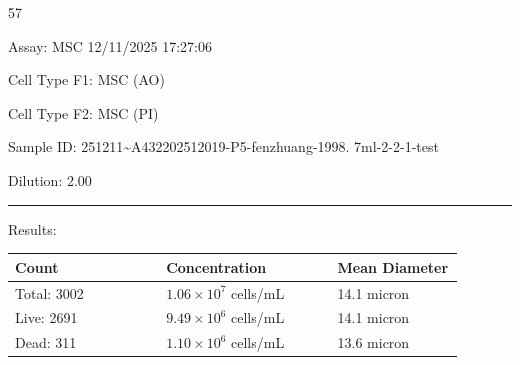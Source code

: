 \documentclass[UTF8,10pt,a4paper,fontset=fandol]{ctexart}
\newcommand{\fieldvalue}[1]{#1}
\newcommand{\handwritten}[1]{#1}
\begin{document}
\bigskip

\handwritten{57}

\newpage

\noindent
Assay:
\fieldvalue{MSC}
\hfill
\fieldvalue{12/11/2025 17:27:06}

\medskip

\noindent
Cell Type F1:
\fieldvalue{MSC (AO)}

\noindent
Cell Type F2:
\fieldvalue{MSC (PI)}

\medskip

\noindent
Sample ID:
\fieldvalue{251211\textasciitilde A432202512019-P5-fenzhuang-1998. 7ml-2-2-1-test}

\noindent
Dilution:
\fieldvalue{2.00}

\medskip
\hrule
\medskip

\noindent
Results:

\begin{center}
\begin{tabular}{@{}p{0.30\linewidth}p{0.34\linewidth}p{0.25\linewidth}@{}}
\textbf{Count} & \textbf{Concentration} & \textbf{Mean Diameter} \\
\hline
Total:
\fieldvalue{3002}
&
\fieldvalue{$1.06\times10^{7}$ cells/mL}
&
\fieldvalue{14.1 micron}
\\[2pt]
Live:
\fieldvalue{2691}
&
\fieldvalue{$9.49\times10^{6}$ cells/mL}
&
\fieldvalue{14.1 micron}
\\[2pt]
Dead:
\fieldvalue{311}
&
\fieldvalue{$1.10\times10^{6}$ cells/mL}
&
\fieldvalue{13.6 micron}
\end{tabular}
\end{center}
\end{document}
